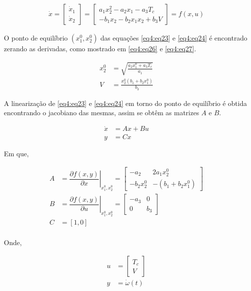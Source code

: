 \begin{align}
\dot{x} = \begin{bmatrix}
    \dot{x}_1\\
    \dot{x}_2
\end{bmatrix} = 
\begin{bmatrix}
    a_1x_2^2 -a_2x_1 -a_3T_c \\
    -b_1x_2 -b_2x_1x_2 + b_3V
\end{bmatrix} = f(x, u)  \label{eq4:eq25}
\end{align}

O ponto de equilíbrio $(x_1^0, x_2^0)$ das equações \ref{eq4:eq23} e \ref{eq4:eq24} é encontrado zerando as derivadas, como mostrado em \ref{eq4:eq26} e \ref{eq4:eq27}.


\begin{align}
     x_2^0 &= \sqrt{\frac{a_2x_1^0 + a_3T_c}{a_1}} \label{eq4:eq26}\\
     V &= \frac{x_2^0(b_1+b_2x_1^0)}{b_3} \label{eq4:eq27}
\end{align}


A linearização de  \ref{eq4:eq23} e \ref{eq4:eq24} em torno do ponto de equilíbrio é obtida encontrando o jacobiano das mesmas, assim se obtêm as matrizes $A$ e $B$.

\begin{align}
     \dot{x} &= Ax + Bu    \label{eq4:eq28}\\
     y &= Cx               \label{eq4:eq29}
\end{align}

Em que, 

\begin{align}
     A &= \left. \dfrac{\partial f(x,y)}{\partial x}\right|_{x_1^0, x_2^0} = \begin{bmatrix}
    -a_2       &   2a_1x_2^0\\
    -b_2x_2^0  & -(b_1+b_2x_1^0)
\end{bmatrix}    \label{eq4:eq30}\\
B &= \left. \dfrac{\partial f(x,y)}{\partial u}\right|_{x_1^0, x_2^0} = \begin{bmatrix}
    -a_3       &   0\\
    0  & b_3
\end{bmatrix}    \label{eq4:eq31}\\
C &= [1, 0]      \label{eq4:eq32}\\
\end{align}


Onde,

\begin{align}
    u &= \begin{bmatrix}
        T_c\\
        V
\end{bmatrix}           \label{eq4:eq33}\\
y &= \dot{\omega}(t)    \label{eq4:eq34}
\end{align}


